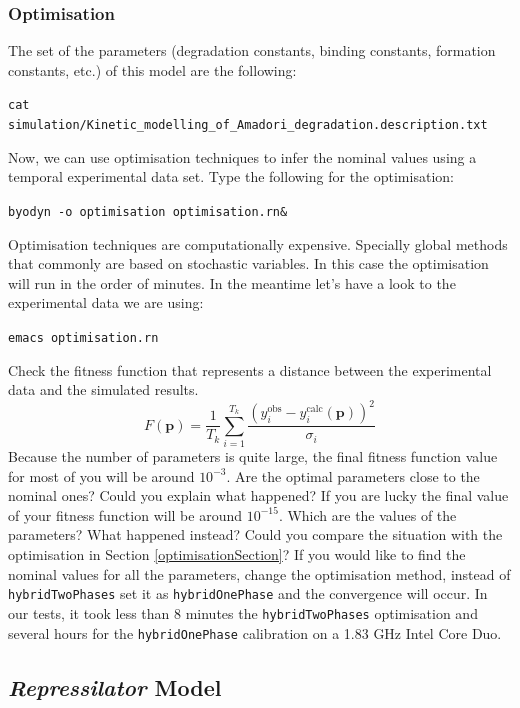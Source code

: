 \documentclass[a4paper, 11pt]{article}
\begin{document}
  \subsubsection{Optimisation}
  The set of the parameters (degradation constants, binding constants, formation constants, etc.)  of this model are the following:
  \begin{center}
    \footnotesize{\texttt{cat simulation/Kinetic\_modelling\_of\_Amadori\_degradation.description.txt}}
  \end{center}
  Now, we can use optimisation techniques to infer the nominal values using a temporal experimental data set.
  Type the following for the optimisation:
  \begin{center}
    \texttt{byodyn -o optimisation optimisation.rn\&}
  \end{center}
  Optimisation techniques are computationally expensive.
  Specially global methods that commonly are based on stochastic variables.
  In this case the optimisation will run in the order of minutes.
  In the meantime let's have a look to the experimental data we are using:
  \begin{center}
    \texttt{emacs optimisation.rn}
  \end{center}
  Check the fitness function that represents a distance between the experimental data and the simulated results.
  \begin{equation}\label{eq:distance}
    F(\mathbf{p}) = \frac{1}{T_k}
    \sum_{i=1}^{T_k} 
    \frac
	{\left(y_{i}^{\mathrm{obs}} - y_{i}^{\mathrm{calc}}(\mathbf{p})\right)^2}
	{\sigma_i}
  \end{equation}
  Because the number of parameters is quite large, the final fitness function value for most of you will be around $10^{-3}$. 
  Are the optimal parameters close to the nominal ones?
  Could you explain what happened?
  If you are lucky the final value of your fitness function will be around $10^{-15}$. 
  Which are the values of the parameters?
  What happened instead?
  Could you compare the situation with the optimisation in Section \ref{optimisationSection}?
  If you would like to find the nominal values for all the parameters, change the optimisation method, instead of \texttt{hybridTwoPhases} set it as \texttt{hybridOnePhase} and the convergence will occur.
  In our tests, it took less than 8 minutes the \texttt{hybridTwoPhases} optimisation and several hours for the \texttt{hybridOnePhase} calibration on a 1.83 GHz Intel Core Duo.
  \subsection{\textit{Repressilator} Model}
\end{document}
